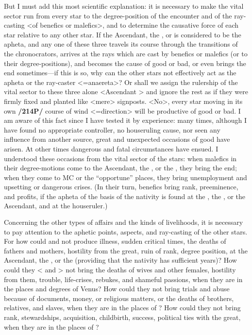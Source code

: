 But I must add this most scientific explanation: it is necessary to make the vital sector run from every star to the degree-position of the encounter and of the ray-casting <of benefics or malefics>, and to determine the causative force of each star relative to any other star. If the Ascendant, the \Sun, or \Moon\xspace is considered to be the apheta, and any one of these three travels its course through the transitions of the chronocrators, arrives at the rays which are cast by benefics or malefics (or to their degree-positions), and becomes the cause of good or bad, or even brings the end sometimes—if this is so, why can the other stars not effectively act as the apheta or the ray-caster <=anaereta>? Or shall we assign the rulership of the vital
sector to these three alone <Ascendant \Sun\xspace \Moon> and ignore the rest as if they were firmly fixed and planted like <mere> signposts. <No>, every star moving in its own \textbf{/214P/} course of wind <=direction> will be productive of good or bad. I am aware of this fact since I have tested it by experience: many times, although I have found no appropriate controller, no houseruling cause, nor seen any influence from another source, great and unexpected occasions of good have arisen. At other times dangerous and fatal circumstances have ensued. I understood these occasions from the vital sector of the stars: when malefics in their degree-motions come to the Ascendant, the \Sun, or the \Moon, they bring the end; when they come to MC or the “opportune”
places, they bring unemployment and upsetting or dangerous crises. (In their turn, benefics bring rank, preeminence, and profits, if the apheta of the basis of the nativity is found at the \Sun, the \Moon, or the Ascendant, and at the houseruler.)

Concerning the other types of affairs and the kinds of livelihoods, it is necessary to pay attention to the aphetic points, aspects, and ray-casting of the other stars. For how could \Saturn\xspace and \Mars\xspace not produce illness, sudden critical times, the deaths of fathers and mothers, hostility from the great, ruin of rank, degree position, at the Ascendant, the \Sun, or the \Moon\xspace (providing that the nativity has sufficient years)? How could they <\Saturn\xspace and \Mars> not bring the deaths of wives and other females, hostility from them, trouble, life-crises, rebukes, and shameful passions, when they are in the places and degrees of Venus? How could they not bring trials and abuse because of documents, money, or religious matters, or the deaths of brothers, relatives, and slaves, when they are in the places of \Mercury? How could they not bring rank, stewardships, acquisition, childbirth, success, political ties with the great, when they are in the places of
\Jupiter?


